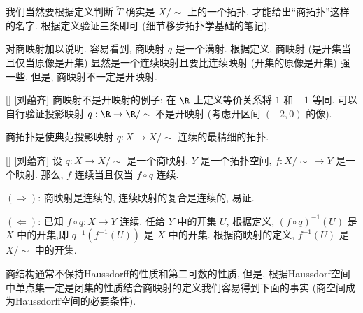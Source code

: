 \documentclass[UTF8]{ctexart}
\begin{document}
        \begin{rmk}
            []
            我们当然要根据定义判断 \(\tilde{T}\) 确实是 \(X/\sim\) 上的一个拓扑, 才能给出``商拓扑''这样的名字. 根据定义验证三条即可 (细节移步拓扑学基础的笔记). 
        \end{rmk}

        
        \begin{rmk}
            []
            对商映射加以说明. 容易看到, 商映射 \(q\) 是一个满射. 根据定义, 商映射 (是开集当且仅当原像是开集) 显然是一个连续映射且要比连续映射 (开集的原像是开集) 强一些. 但是, 商映射不一定是开映射. 
        \end{rmk}

        \begin{cxmp}
            []
            {}
            []
            [刘蕴齐]
            商映射不是开映射的例子: 在 \(\R\) 上定义等价关系将 \(1\) 和 \(-1\) 等同. 可以自行验证投影映射 \(q: \R \to \R/\sim\) 不是开映射 (考虑开区间 \((-2,0)\) 的像). 
        \end{cxmp}
        
        \begin{rmk}
            []
            商拓扑是使典范投影映射 \(q: X \to X/\sim\) 连续的最精细的拓扑. 
        \end{rmk}

        \begin{lma}
            []
            {}
            []
            [刘蕴齐]
            设 \(q: X \to X/\sim\) 是一个商映射.  \(Y\) 是一个拓扑空间, \(f: X/\sim \, \to Y\) 是一个映射. 那么,  \(f\) 连续当且仅当 \(f \circ q\) 连续.    
        \end{lma}

        \begin{prf}
             \((\Rightarrow)\): 商映射是连续的, 连续映射的复合是连续的, 易证. 

             \((\Leftarrow)\): 已知 \(f \circ q: X \to Y\) 连续. 任给 \(Y\) 中的开集 \(U\), 根据定义, \({(f \circ q)}^{-1}(U)\) 是 \(X\) 中的开集,即 \(q^{-1}(f^{-1}(U))\) 是 \(X\) 中的开集. 根据商映射的定义,  \(f^{-1}(U)\) 是 \(X/\sim\) 中的开集. 
        \end{prf}

        \vspace{10pt}
        
        商结构通常不保持Haussdorff的性质和第二可数的性质, 但是, 根据Haussdorf空间中单点集一定是闭集的性质结合商映射的定义我们容易得到下面的事实 (商空间成为Haussdorff空间的必要条件). 
\end{document}
